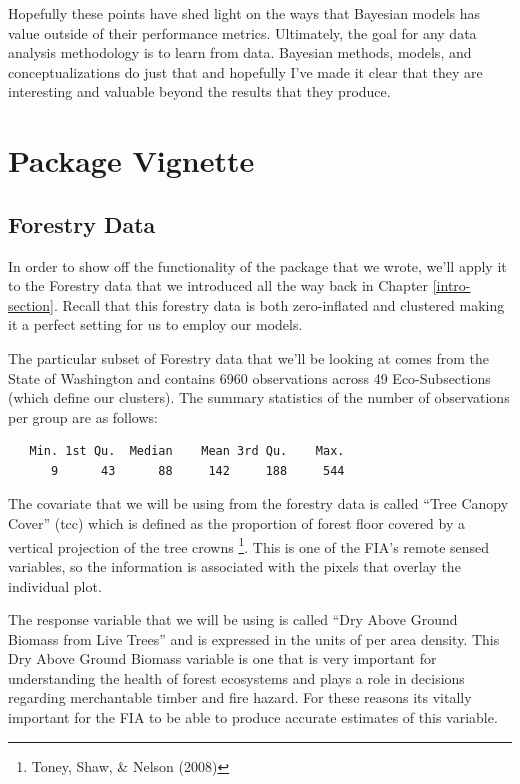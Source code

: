 \documentclass[12pt,twoside]{reedthesis}
\begin{document}
Hopefully these points have shed light on the ways that Bayesian models has value outside of their performance metrics. Ultimately, the goal for any data analysis methodology is to learn from data. Bayesian methods, models, and conceptualizations do just that and hopefully I've made it clear that they are interesting and valuable beyond the results that they produce.

\hypertarget{vignette}{%
\chapter{Package Vignette}\label{vignette}}

\hypertarget{forestry-data}{%
\section{Forestry Data}\label{forestry-data}}

In order to show off the functionality of the package that we wrote, we'll apply it to the Forestry data that we introduced all the way back in Chapter \ref{intro-section}. Recall that this forestry data is both zero-inflated and clustered making it a perfect setting for us to employ our models.

The particular subset of Forestry data that we'll be looking at comes from the State of Washington and contains 6960 observations across 49 Eco-Subsections (which define our clusters). The summary statistics of the number of observations per group are as follows:
\begin{verbatim}
   Min. 1st Qu.  Median    Mean 3rd Qu.    Max. 
      9      43      88     142     188     544 
\end{verbatim}
The covariate that we will be using from the forestry data is called ``Tree Canopy Cover'' (tcc) which is defined as the proportion of forest floor covered by a vertical projection of the tree crowns \footnote{Toney, Shaw, \& Nelson (2008)}. This is one of the FIA's remote sensed variables, so the information is associated with the pixels that overlay the individual plot.

The response variable that we will be using is called ``Dry Above Ground Biomass from Live Trees'' and is expressed in the units of per area density. This Dry Above Ground Biomass variable is one that is very important for understanding the health of forest ecosystems and plays a role in decisions regarding merchantable timber and fire hazard. For these reasons its vitally important for the FIA to be able to produce accurate estimates of this variable.
\end{document}
